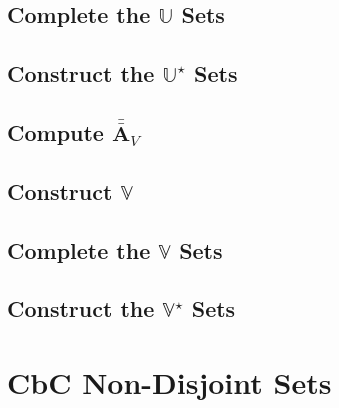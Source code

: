 \documentclass{book}[12pt]
\numberwithin{equation}{section}
\newcommand{\mat}[1]{\bar{\bar{\mathbf{#1}}}}
\begin{document}
\section{Complete the $\mathbb{U}$ Sets}


\newpage
\section{Construct the $\mathbb{U}^\star$ Sets}


\section{Compute $\mat{A}_V$}


\section{Construct $\mathbb{V}$}


\newpage
\section{Complete the $\mathbb{V}$ Sets}


\newpage
\section{Construct the $\mathbb{V}^\star$ Sets}






\chapter{CbC Non-Disjoint Sets}

\end{document}
